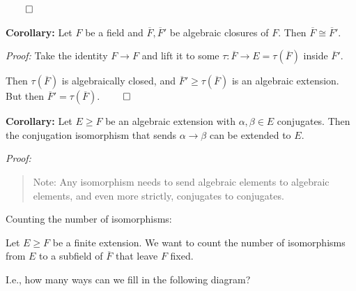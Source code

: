 \(\qed\)

\textbf{Corollary:} Let \(F\) be a field and
\(\overline F, \overline F'\) be algebraic closures of \(F\). Then
\(\overline F \cong \overline F'\).

\emph{Proof:} Take the identity \(F \to F\) and lift it to some
\(\tau: \overline F \to E = \tau(\overline F)\) inside
\(\overline F '\).

\begin{center}
\end{center}

Then \(\tau(\overline F)\) is algebraically closed, and
\(\overline F' \geq \tau(\overline F)\) is an algebraic extension. But
then \(\overline F' = \tau(\overline F)\). \(\qed\)

\textbf{Corollary:} Let \(E \geq F\) be an algebraic extension with
\(\alpha, \beta \in E\) conjugates. Then the conjugation isomorphism
that sends \(\alpha \to \beta\) can be extended to \(E\).

\emph{Proof:}

\begin{center}
\end{center}

\begin{quote}
Note: Any isomorphism needs to send algebraic elements to algebraic
elements, and even more strictly, conjugates to conjugates.
\end{quote}

Counting the number of isomorphisms:

Let \(E \geq F\) be a finite extension. We want to count the number of
isomorphisms from \(E\) to a subfield of \(\overline F\) that leave
\(F\) fixed.

I.e., how many ways can we fill in the following diagram?

